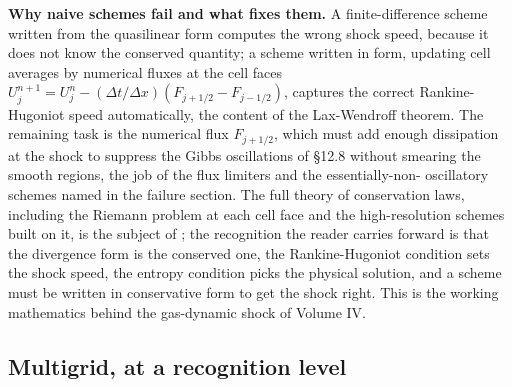 \begin{mastery}
\textbf{Why naive schemes fail and what fixes them.} A
finite-difference scheme written from the quasilinear form computes
the wrong shock speed, because it does not know the conserved
quantity; a scheme written in  form, updating
cell averages by numerical fluxes at the cell faces $U_{j}^{n+1} =
U_{j}^{n} - (\Delta t/\Delta x)(F_{j+1/2} - F_{j-1/2})$, captures the
correct Rankine-Hugoniot speed automatically, the content of the
Lax-Wendroff theorem. The remaining task is the numerical flux
$F_{j+1/2}$, which must add enough dissipation at the shock to
suppress the Gibbs oscillations of §12.8 without smearing the smooth
regions, the job of the flux limiters and the essentially-non-
oscillatory schemes named in the failure section. The full theory of
conservation laws, including the Riemann problem at each cell face
and the high-resolution schemes built on it, is the subject of
\textcite{text:v2ch12-leveque-fdm}; the recognition the reader
carries forward is that the divergence form is the conserved one,
the Rankine-Hugoniot condition sets the shock speed, the entropy
condition picks the physical solution, and a scheme must be written
in conservative form to get the shock right. This is the working
mathematics behind the gas-dynamic shock of Volume IV.
\end{mastery}

\subsection{Multigrid, at a recognition level}

